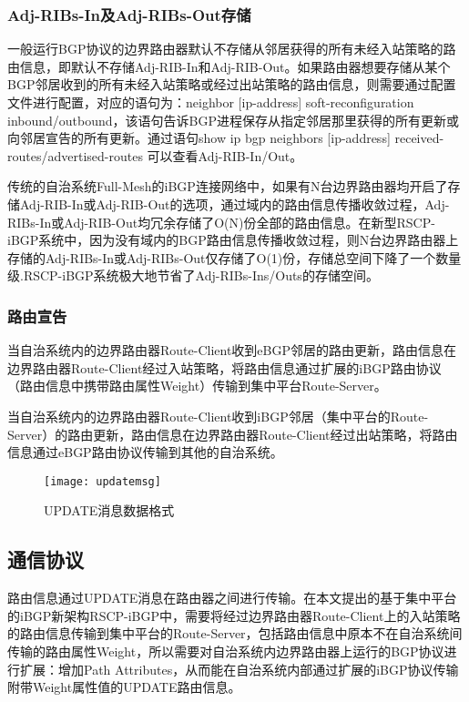 \subsubsection{Adj-RIBs-In及Adj-RIBs-Out存储}
一般运行BGP协议的边界路由器默认不存储从邻居获得的所有未经入站策略的路由信息，即默认不存储Adj-RIB-In和Adj-RIB-Out。如果路由器想要存储从某个BGP邻居收到的所有未经入站策略或经过出站策略的路由信息，则需要通过配置文件进行配置，对应的语句为：neighbor [ip-address] soft-reconfiguration inbound/outbound，该语句告诉BGP进程保存从指定邻居那里获得的所有更新或向邻居宣告的所有更新。通过语句show ip
bgp neighbors [ip-address] received-routes/advertised-routes 可以查看Adj-RIB-In/Out。

传统的自治系统Full-Mesh的iBGP连接网络中，如果有N台边界路由器均开启了存储Adj-RIB-In或Adj-RIB-Out的选项，通过域内的路由信息传播收敛过程，Adj-RIBs-In或Adj-RIB-Out均冗余存储了O(N)份全部的路由信息。在新型RSCP-iBGP系统中，因为没有域内的BGP路由信息传播收敛过程，则N台边界路由器上存储的Adj-RIBs-In或Adj-RIBs-Out仅存储了O(1)份，存储总空间下降了一个数量级.RSCP-iBGP系统极大地节省了Adj-RIBs-Ins/Outs的存储空间。


\subsubsection{路由宣告}

当自治系统内的边界路由器Route-Client收到eBGP邻居的路由更新，路由信息在边界路由器Route-Client经过入站策略，将路由信息通过扩展的iBGP路由协议（路由信息中携带路由属性Weight）传输到集中平台Route-Server。

当自治系统内的边界路由器Route-Client收到iBGP邻居（集中平台的Route-Server）的路由更新，路由信息在边界路由器Route-Client经过出站策略，将路由信息通过eBGP路由协议传输到其他的自治系统。

\begin{figure}
  \centering
  \texttt{[image: updatemsg]}
  \caption{UPDATE消息数据格式}
  \label{fig:updatemsg}
\end{figure}



\subsection{通信协议}
路由信息通过UPDATE消息在路由器之间进行传输。在本文提出的基于集中平台的iBGP新架构RSCP-iBGP中，需要将经过边界路由器Route-Client上的入站策略的路由信息传输到集中平台的Route-Server，包括路由信息中原本不在自治系统间传输的路由属性Weight，所以需要对自治系统内边界路由器上运行的BGP协议进行扩展：增加Path Attributes，从而能在自治系统内部通过扩展的iBGP协议传输附带Weight属性值的UPDATE路由信息。

